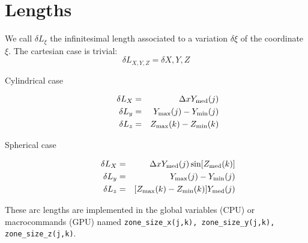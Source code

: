 \documentclass{article}
\begin{document}
\section{Lengths}
We call $\delta L_\xi$ the infinitesimal length associated to a variation $\delta\xi$ of the coordinate $\xi$. The cartesian case is trivial:
\begin{equation}
  \label{eq:14}
  \delta L_{X,Y,Z} = \delta {X,Y,Z}
\end{equation}
\begin{description}
\item[Cylindrical case] 
  \begin{eqnarray}
   \label{eq:15}
   \delta L_X &=& \Delta x Y_{\rm med}(j)\\
   \delta L_y &=& Y_{\rm max}(j)-Y_{\rm min}(j)\\
   \delta L_z &=& Z_{\rm max}(k)-Z_{\rm min}(k)
\end{eqnarray}
\item[Spherical case] 
  \begin{eqnarray}
   \label{eq:16}
   \delta L_X &=& \Delta x Y_{\rm med}(j)\sin[Z_{\rm med}(k)]\\
   \delta L_y &=& Y_{\rm max}(j)-Y_{\rm min}(j)\\
   \delta L_z &=& [Z_{\rm max}(k)-Z_{\rm min}(k)]Y_{\rm med}(j)
\end{eqnarray}
\end{description}
These arc lengths are implemented in the global variables (CPU) or macrocommands (GPU)
named {\verb?zone_size_x(j,k), zone_size_y(j,k), zone_size_z(j,k)?}.
\end{document}
